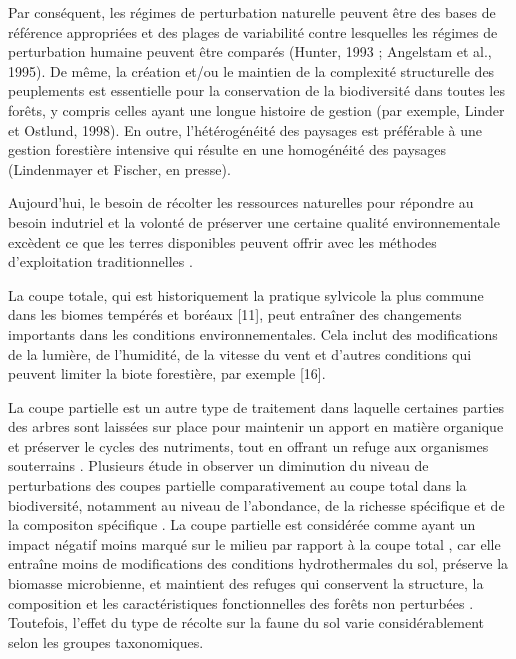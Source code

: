 Par conséquent, les régimes de perturbation naturelle peuvent être des bases de référence appropriées et des plages de variabilité contre lesquelles les régimes de perturbation humaine peuvent être comparés (Hunter, 1993 ; Angelstam et al., 1995).
De même, la création et/ou le maintien de la complexité structurelle des peuplements est essentielle pour la conservation de la biodiversité dans toutes les forêts, y compris celles ayant une longue histoire de gestion (par exemple, Linder et Ostlund, 1998). 
En outre, l'hétérogénéité des paysages est préférable à une gestion forestière intensive qui résulte en une homogénéité des paysages (Lindenmayer et Fischer, en presse).

Aujourd'hui, le besoin de récolter les ressources naturelles pour répondre au besoin indutriel et la volonté de préserver une certaine qualité environnementale excèdent ce que les terres disponibles peuvent offrir avec les méthodes d'exploitation traditionnelles \citep{Sala2000Globalbiodiversity,Newbold2015Globaleffects}. 


La coupe totale, qui est historiquement la pratique sylvicole la plus commune dans les biomes tempérés et boréaux [11], peut entraîner des changements importants dans les conditions environnementales. 
Cela inclut des modifications de la lumière, de l'humidité, de la vitesse du vent et d'autres conditions qui peuvent limiter la biote forestière, par exemple [16].

La coupe partielle est un autre type de traitement dans laquelle certaines parties des arbres sont laissées sur place pour maintenir un apport en matière organique et préserver le cycles des nutriments, tout en offrant un refuge aux organismes souterrains \citep{Dahlgren1994effectswholetree,Barg1999Influencepartial}. 
Plusieurs étude in observer un diminution du niveau de perturbations des coupes partielle  comparativement au coupe total dans la biodiversité, notamment au niveau de l'abondance, de la richesse spécifique et de la compositon spécifique \citep{Kudrin2023metaanalysiseffects}. 
La coupe partielle est considérée comme ayant un impact négatif moins marqué sur le milieu par rapport à la coupe total \citep{Fedrowitz2014Canretention,Chaudhary2016Impactforest}, 
car elle entraîne moins de modifications des conditions hydrothermales du sol, préserve la biomasse microbienne, 
et maintient des refuges qui conservent la structure, la composition et les caractéristiques fonctionnelles des forêts non perturbées \citep{Londo1999Forestharvesting,Gustafsson2012Retentionforestry,Holden2013metaanalysissoil}. 
Toutefois, l'effet du type de récolte sur la faune du sol varie considérablement selon les groupes taxonomiques.

